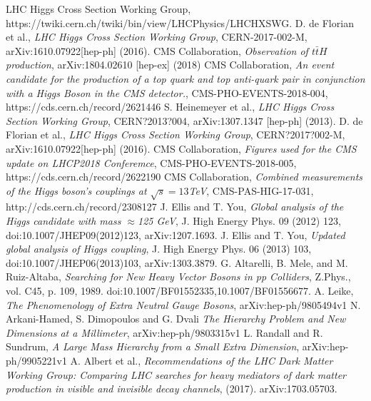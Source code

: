 \begin{thebibliography}{999}
		 LHC Higgs Cross Section Working Group, \\https://twiki.cern.ch/twiki/bin/view/LHCPhysics/LHCHXSWG.
		 D. de Florian et al., \emph{LHC Higgs Cross Section Working Group}, CERN-2017-002-M, arXiv:1610.07922[hep-ph] (2016).
		 CMS Collaboration, \emph{Observation of $t\bar{t}H$ production}, 	arXiv:1804.02610 [hep-ex] (2018)
		 CMS Collaboration, \emph{An event candidate for the production of a top quark and top anti-quark pair in conjunction with a Higgs Boson in the CMS detector.}, CMS-PHO-EVENTS-2018-004, https://cds.cern.ch/record/2621446		
		 S. Heinemeyer et al., \emph{LHC Higgs Cross Section Working Group}, CERN?2013?004, arXiv:1307.1347 [hep-ph] (2013).
		 D. de Florian et al., \emph{LHC Higgs Cross Section Working Group}, CERN?2017?002-M, arXiv:1610.07922[hep-ph] (2016).
		 CMS Collaboration, \emph{Figures used for the CMS update on LHCP2018 Conferemce}, CMS-PHO-EVENTS-2018-005, https://cds.cern.ch/record/2622190
		 CMS Collaboration, \emph{Combined measurements of the Higgs boson's couplings at $\sqrt{s} = 13$TeV}, CMS-PAS-HIG-17-031, http://cds.cern.ch/record/2308127
		 J. Ellis and T. You, \emph{Global analysis of the Higgs candidate with mass $\approx$125 GeV}, J. High Energy Phys. 09 (2012) 123, doi:10.1007/JHEP09(2012)123, arXiv:1207.1693.
		 J. Ellis and T. You, \emph{Updated global analysis of Higgs coupling}, J. High Energy Phys. 06 (2013) 103, doi:10.1007/JHEP06(2013)103, arXiv:1303.3879.
		 G. Altarelli, B. Mele, and M. Ruiz-Altaba, \emph{Searching for New Heavy Vector Bosons in pp Colliders}, Z.Phys., vol. C45, p. 109, 1989. doi:10.1007/BF01552335,10.1007/BF01556677.
		 A. Leike, \emph{The Phenomenology of Extra Neutral Gauge Bosons}, arXiv:hep-ph/9805494v1
		 N. Arkani-Hamed, S. Dimopoulos and G. Dvali \emph{The Hierarchy Problem and New Dimensions at a Millimeter}, arXiv:hep-ph/9803315v1
		 L. Randall and R. Sundrum, \emph{A Large Mass Hierarchy from a Small Extra Dimension}, arXiv:hep-ph/9905221v1
		 A. Albert et al., \emph{Recommendations of the LHC Dark Matter Working Group: Comparing LHC searches for heavy mediators of dark matter production in visible and invisible decay channels}, (2017). arXiv:1703.05703.
		

\end{thebibliography}
